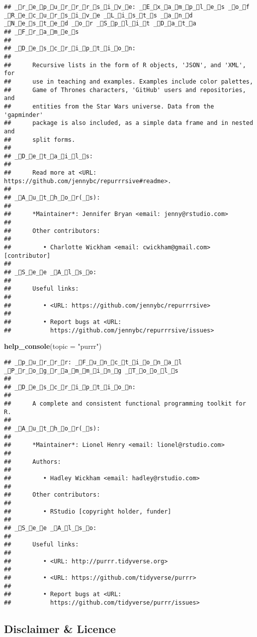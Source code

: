 \documentclass[]{article}
\newenvironment{Shaded}{\begin{snugshade}}{\end{snugshade}}
\newcommand{\KeywordTok}[1]{\textcolor[rgb]{0.13,0.29,0.53}{\textbf{#1}}}
\newcommand{\DataTypeTok}[1]{\textcolor[rgb]{0.13,0.29,0.53}{#1}}
\newcommand{\StringTok}[1]{\textcolor[rgb]{0.31,0.60,0.02}{#1}}
\newcommand{\NormalTok}[1]{#1}
\begin{document}
\begin{verbatim}
## _r_e_p_u_r_r_r_s_i_v_e: _E_x_a_m_p_l_e_s _o_f _R_e_c_u_r_s_i_v_e _L_i_s_t_s _a_n_d _N_e_s_t_e_d _o_r _S_p_l_i_t _D_a_t_a
## _F_r_a_m_e_s
## 
## _D_e_s_c_r_i_p_t_i_o_n:
## 
##      Recursive lists in the form of R objects, 'JSON', and 'XML', for
##      use in teaching and examples. Examples include color palettes,
##      Game of Thrones characters, 'GitHub' users and repositories, and
##      entities from the Star Wars universe. Data from the 'gapminder'
##      package is also included, as a simple data frame and in nested and
##      split forms.
## 
## _D_e_t_a_i_l_s:
## 
##      Read more at <URL: https://github.com/jennybc/repurrrsive#readme>.
## 
## _A_u_t_h_o_r(_s):
## 
##      *Maintainer*: Jennifer Bryan <email: jenny@rstudio.com>
## 
##      Other contributors:
## 
##         • Charlotte Wickham <email: cwickham@gmail.com> [contributor]
## 
## _S_e_e _A_l_s_o:
## 
##      Useful links:
## 
##         • <URL: https://github.com/jennybc/repurrrsive>
## 
##         • Report bugs at <URL:
##           https://github.com/jennybc/repurrrsive/issues>
\end{verbatim}

\begin{Shaded}
\begin{Highlighting}[]
\KeywordTok{help_console}\NormalTok{(}\DataTypeTok{topic =} \StringTok{"purrr"}\NormalTok{)}
\end{Highlighting}
\end{Shaded}

\begin{verbatim}
## _p_u_r_r_r: _F_u_n_c_t_i_o_n_a_l _P_r_o_g_r_a_m_m_i_n_g _T_o_o_l_s
## 
## _D_e_s_c_r_i_p_t_i_o_n:
## 
##      A complete and consistent functional programming toolkit for R.
## 
## _A_u_t_h_o_r(_s):
## 
##      *Maintainer*: Lionel Henry <email: lionel@rstudio.com>
## 
##      Authors:
## 
##         • Hadley Wickham <email: hadley@rstudio.com>
## 
##      Other contributors:
## 
##         • RStudio [copyright holder, funder]
## 
## _S_e_e _A_l_s_o:
## 
##      Useful links:
## 
##         • <URL: http://purrr.tidyverse.org>
## 
##         • <URL: https://github.com/tidyverse/purrr>
## 
##         • Report bugs at <URL:
##           https://github.com/tidyverse/purrr/issues>
\end{verbatim}

\subsection{Disclaimer \& Licence}\label{disclaimer-licence}
\end{document}
